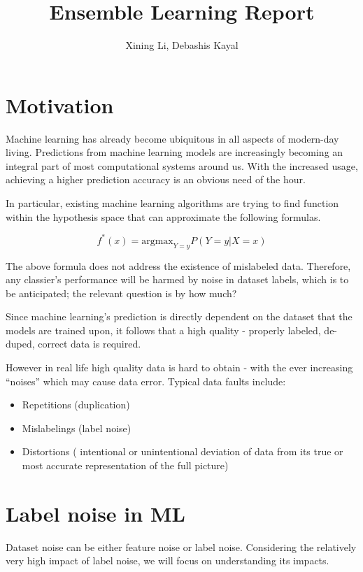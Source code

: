 \documentclass{article}
\author{Xining Li, Debashis Kayal}
\title {Ensemble Learning Report}
\date{}
\begin{document}
\maketitle

\section{Motivation}

Machine learning has already become ubiquitous in all aspects of modern-day living. Predictions from machine learning models are increasingly becoming an integral part of most computational systems around us. With the increased usage, achieving a higher prediction accuracy is an obvious need of the hour. 


In particular, existing machine learning algorithms are trying to find function within the hypothesis space that can approximate the following formulas.

\begin{equation}
    f^*(x) = {\mathrm {argmax}}_{Y=y} P (Y=y|X=x)
\end{equation}

The above formula does not address the existence of mislabeled data. Therefore, any classier's performance will be harmed by noise in dataset labels, which is to be anticipated; the relevant question is by how much?

Since machine learning’s prediction is directly dependent on the dataset that the models are trained upon, it follows that a high quality - properly labeled, de-duped, correct data is required. 

However in real life high quality data is hard to obtain - with the ever increasing “noises” which may cause data error. Typical data faults include: 

\begin{itemize}
    \item Repetitions (duplication)
    \item Mislabelings (label noise)
    \item Distortions ( intentional or unintentional deviation of data from its true or most accurate representation of the full picture)
\end{itemize}

\section{Label noise in ML}

Dataset noise can be either feature noise or label noise. Considering the relatively very high impact of label noise, we will focus on understanding its impacts.
\end{document}
